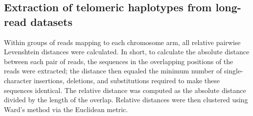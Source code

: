 \documentclass{article}
\begin{document}
\subsection*{Extraction of telomeric haplotypes from long-read datasets} %
Within groups of reads mapping to each chromosome arm, all relative pairwise Levenshtein distances were calculated. %
In short, to calculate the absolute distance between each pair of reads, the sequences in the overlapping positions of the reads were extracted; the distance then equaled the minimum number of single-character insertions, deletions, and substitutions required to make these sequences identical. %
The relative distance was computed as the absolute distance divided by the length of the overlap.
Relative distances were then clustered using Ward's method via the Euclidean metric.
\end{document}
